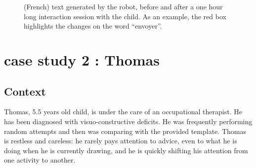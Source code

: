\documentclass{sig-alternate}
\begin{document}
\begin{figure}
    \centering

    \caption{\small (French) text generated by the robot, before and after a one
        hour long interaction session with the child. As an example, the red box
        highlights the changes on the word ``envoyer''.}

    \label{fig:stimuli}
\end{figure}



\section{case study 2 : Thomas}\label{Thomas}

\subsection{Context}

Thomas, 5.5 years old child, is under the care of an occupational
therapist. He has been diagnosed with visuo-constructive deficits.
He was frequently performing random attempts and then was comparing
with the provided template. Thomas is restless and careless: he
rarely pays attention to
advice, even to what he is doing when he is currently drawing, and he is
quickly shifting his attention from one activity to another.
\end{document}
